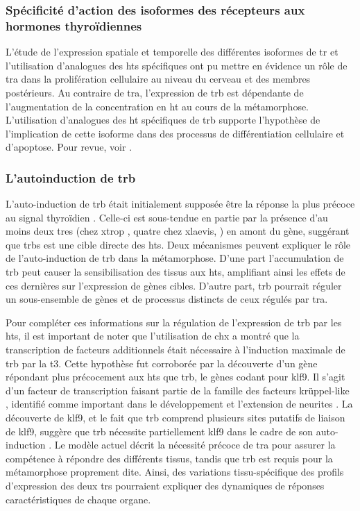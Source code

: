 \documentclass[../main.tex]{subfiles}
\begin{document}
		\subsubsection{Spécificité d'action des isoformes des récepteurs aux hormones thyroïdiennes}
			L'étude de l'expression spatiale et temporelle des différentes isoformes de \gls{tr} et l'utilisation d'analogues des \glspl{ht} spécifiques ont pu mettre en évidence un rôle de \gls{tra} dans la prolifération cellulaire au niveau du cerveau et des membres postérieurs.
			Au contraire de \gls{tra}, l'expression de \gls{trb} est dépendante de l'augmentation de la concentration en \gls{ht} au cours de la métamorphose.
			L'utilisation d'analogues des \gls{ht} spécifiques de \gls{trb} supporte l'hypothèse de l'implication de cette isoforme dans des processus de différentiation cellulaire et d'apoptose.
			Pour revue, voir \citep{Furlow2006,Denver2009a}.

		\subsubsection{L'autoinduction de \gls{trb}}
			L'auto-induction de \gls{trb} était initialement supposée être la réponse la plus précoce au signal thyroïdien \citep{Yaoita1990}.
			Celle-ci est sous-tendue en partie par la présence d'au moins deux \glspl{tre} (chez \gls{xtrop} \citealp{Bilesimo2011}, quatre chez \gls{xlaevis}, \citealp{Ranjan1994,Machuca1995,Urnov2001}) en amont du gène, suggérant que \glspl{trb} est une cible directe des \glspl{ht}.
			Deux mécanismes peuvent expliquer le rôle de l'auto-induction de \gls{trb} dans la métamorphose.
			D'une part l'accumulation de \gls{trb} peut causer la sensibilisation des tissus aux \glspl{ht}, amplifiant ainsi les effets de ces dernières sur l'expression de gènes cibles.
			D'autre part, \gls{trb} pourrait réguler un sous-ensemble de gènes et de processus distincts de ceux régulés par \gls{tra}.
			\par
			Pour compléter ces informations sur la régulation de l'expression de \gls{trb} par les \glspl{ht}, il est important de noter que l'utilisation de \gls{chx} a montré que la transcription de facteurs additionnels était nécessaire à l'induction maximale de \gls{trb} par la \gls{t3}.
			Cette hypothèse fut corroborée par la découverte d'un gène répondant plus précocement aux \glspl{ht} que \gls{trb}, le gènes codant pour \gls{klf9}.
			Il s'agit d'un facteur de transcription faisant partie de la famille des facteurs krüppel-like \citep{Knoedler2014}, identifié comme important dans le développement et l'extension de neurites \citep{Scobie2009}.
			La découverte de \gls{klf9}, et le fait que \gls{trb} comprend plusieurs sites putatifs de liaison de \gls{klf9}, suggère que \gls{trb} nécessite partiellement \gls{klf9} dans le cadre de son auto-induction \citep{Bagamasbad2008}.
			Le modèle actuel décrit la nécessité précoce de \gls{tra} pour assurer la compétence à répondre des différents tissus, tandis que \gls{trb} est requis pour la métamorphose proprement dite.
			Ainsi, des variations tissu-spécifique des profils d'expression des deux \glspl{tr} pourraient expliquer des dynamiques de réponses caractéristiques de chaque organe.
\end{document}
